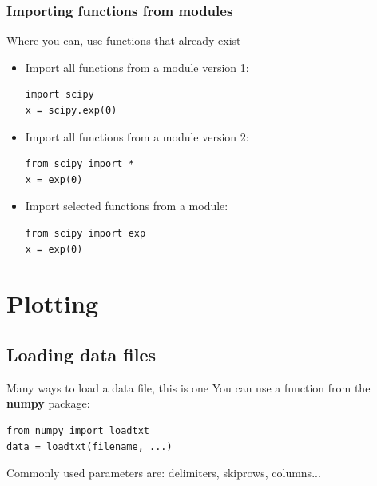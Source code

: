 \documentclass{beamer}
\begin{document}
\begin{frame}[fragile]
  \frametitle{Importing functions from modules}
  \begin{block}{Where you can, use functions that already exist}
	 \begin{itemize}[<+->]
		 \item Import all functions from a module version 1:
\begin{lstlisting}
import scipy
x = scipy.exp(0)
\end{lstlisting}
		 \item Import all functions from a module version 2:
\begin{lstlisting}
from scipy import *
x = exp(0)
\end{lstlisting}
		 \item Import selected functions from a module:
\begin{lstlisting}
from scipy import exp
x = exp(0)
\end{lstlisting}
	 \end{itemize}
  \end{block}
\end{frame}

\section{Plotting}
\subsection{Loading data files}
\begin{frame}[fragile]
  \begin{block}{Many ways to load a data file, this is one}
  You can use a function from the \textbf{numpy} package:
\begin{lstlisting}
from numpy import loadtxt
data = loadtxt(filename, ...)
\end{lstlisting}
  Commonly used parameters are: delimiters, skiprows, columns...
  \end{block}
\end{frame}
\end{document}
